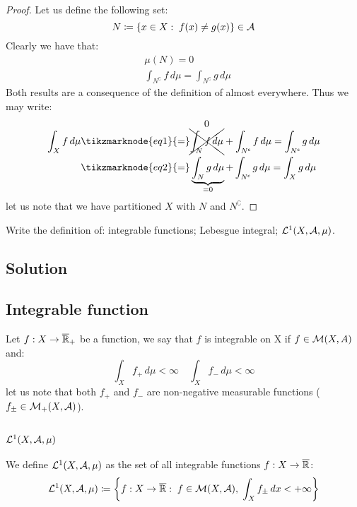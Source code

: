 \begin{proof}
    Let us define the following set:
    \[
        N \coloneqq \left\{ x \in X : \; f(x) \neq g(x) \right\} \in\mathcal{A}  
    \]
    Clearly we have that:
    \begin{align*}
        & \mu(N) =  0 \\
        & \int_{N^\complement} f \, d\mu = \int_{N^\complement} g \, d\mu
    \end{align*}
    Both results are a consequence of the definition of almost everywhere. Thus we may write:
    \begin{align*}
        \int_X f \, d\mu & \tikzmarknode{eq1}{=} \cancelnum{0}{\int_N f \, d\mu} + \int_{N^\complement} f \, d\mu = \int_{N^\complement} g \, d\mu\\
        & \tikzmarknode{eq2}{=} \underbrace{\int_N g \, d\mu}_{=0} + \int_{N^\complement} g \, d\mu = \int_X g \, d\mu\\
    \end{align*} 
    let us note that we have partitioned $X$ with $N$ and $N^\complement$.
\end{proof}


\question
Write the definition of: integrable functions; Lebesgue integral; $\mathcal{L}^1 (X, \mathcal{A}, \mu)$.

\subsection*{Solution}

\subsection{Integrable function}
Let $f:X\to\overline{\mathbb{R}}_{+}$ be a function, we say that $f$ is integrable on X if $f\in\mathcal{M}(X,A)$ and:
\[
    \int_X f_+ \, d\mu < \infty \quad \int_X f_- \, d\mu < \infty
\]
let us note that both $f_+$ and $f_-$ are non-negative measurable functions ($f_\pm\in\mathcal{M}_+(X,\mathcal{A})$).

\subsection{\texorpdfstring{$\mathcal{L}^1(X,\mathcal{A},\mu)$}{L1}}
We define $\mathcal{L}^1(X,\mathcal{A},\mu)$ as the set of all integrable functions $f:X\to\overline{\mathbb{R}}$:
\[
    \mathcal{L}^1(X,\mathcal{A},\mu) \coloneqq \left\{ f:X\to\overline{\mathbb{R}}: \; f\in\mathcal{M}(X,\mathcal{A}), \; \int_X f_\pm \, dx < +\infty  \right\}
\]

